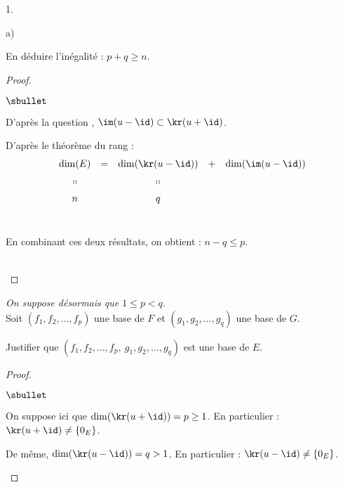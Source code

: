 \begin{noliste}{1.}
\begin{noliste}{a)}
  \item En déduire l'inégalité : $p + q \geq n$.
    
    \begin{proof}~
      \begin{noliste}{$\sbullet$}
      \item D'après la question , $\im(u-\id) \subset \kr(u
        + \id)$.%

      \item D'après le théorème du rang :
	\[
        \begin{array}{ccccc}
          \dim(E) & = & \dim(\kr(u-\id)) & + & \dim(\im(u-\id))
          \\[.2cm]
          \shortparallel & & \shortparallel & & 
          \\[.2cm]
          n & & q & & 
        \end{array}        
	\]
	~

      \item En combinant ces deux résultats, on obtient : $n - q \leq
        p$.\\%
        ~\\[-1.4cm]
      \end{noliste}
    \end{proof}
    {\it On suppose désormais que $1\leq p<q$.}\\
    Soit $(f_1, f_2, \ldots, f_p)$ une base de $F$ et $(g_1, g_2,
    \ldots, g_q)$ une base de $G$.

  \item Justifier que $(f_1, f_2, \hdots, f_p, \ g_1,g_2,\hdots,g_q)$
    est une base de $E$.
    
    \begin{proof}~%
      \begin{noliste}{$\sbullet$}
      \item On suppose ici que $\dim(\kr(u + \id)) = p \geq 1$. En
        particulier : $\kr(u + \id) \neq \{ 0_E \}$.%

      \item De même, $\dim(\kr(u - \id)) = q > 1$. En particulier :
        $\kr(u - \id) \neq \{ 0_E \}$.%



\end{noliste}
\end{proof}
\end{noliste}
\end{noliste}

